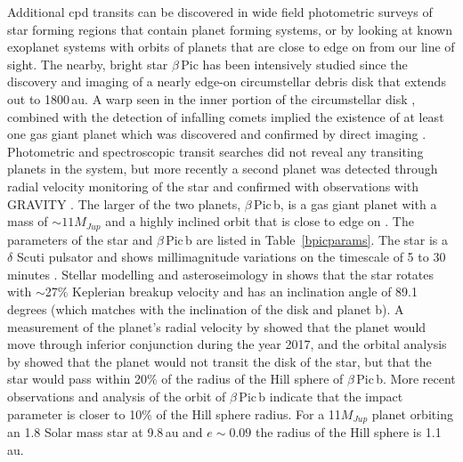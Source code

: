 \documentclass[longauth]{aa} %
\newcommand{\bpb}{$\beta$\,Pic\,b}
\newcommand{\bp}{$\beta$\,Pic}
\begin{document}
Additional \ac{cpd} transits can be discovered in wide field photometric surveys of star forming regions that contain planet forming systems, or by looking at known exoplanet systems with orbits of planets that are close to edge on from our line of sight.
%
The nearby, bright star \bp{} \citep[$d$\,=\,19.44\,pc,  $V$\,=\,3.85;][]{vanLeeuwen07b} has been intensively studied since the discovery and imaging of a nearly edge-on circumstellar debris disk \citep{Smith84,Kalas95} that extends out to 1800\,au.
%
A warp seen in the inner portion of the circumstellar disk \citep{Heap00}, combined with the detection of infalling comets \citep[see references in ][]{Kiefer14} implied the existence of at least one gas giant planet \citep{Mouillet97,Augereau01} which was discovered and confirmed by direct imaging \citep{Lagrange09,Lagrange10}.
%
Photometric \citep{Lous18} and spectroscopic transit searches \citep{vanSluijs19} did not reveal any transiting planets in the system, but more recently a second planet was detected through radial velocity monitoring of the star \citep{Lagrange19} and confirmed with observations with GRAVITY \citep{Nowak20,Lagrange20}.
%
The larger of the two planets, \bpb{}, is a gas giant planet with a mass of $\sim 11 M_{Jup}$ \citep{Lagrange20} and a highly inclined orbit that is close to edge on \citep{Millar-Blanchaer15,Wang16,Nielsen20,Lagrange20}.
%
The parameters of the star and \bpb{} are listed in Table~\ref{bpicparams}.
%
The star is a $\delta$ Scuti pulsator and shows millimagnitude variations on the timescale of 5 to 30 minutes \citep{koen2003a,koen2003b,Merkania17,Zwintz19}.
%
Stellar modelling and asteroseimology in \citet{Zwintz19} shows that the star rotates with $\sim$27\% Keplerian breakup velocity and has an inclination angle of 89.1 degrees (which matches with the inclination of the disk and planet b). 
%
A measurement of the planet's radial velocity by \citet{Snellen14} showed that the planet would move through inferior conjunction during the year 2017, and the orbital analysis by \citet{Wang16} showed that the planet would not transit the disk of the star, but that the star would pass within 20\% of the radius of the Hill sphere of \bpb{}.
%
More recent observations and analysis of the orbit of \bpb{} \citep{Lagrange19,Nielsen20} indicate that the impact parameter is closer to 10\% of the Hill sphere radius.
%
For a 11$M_{Jup}$ planet orbiting an 1.8 Solar mass star at 9.8\,au and $e\sim 0.09$ the radius of the Hill sphere is 1.1\,au.

%
%
\end{document}
